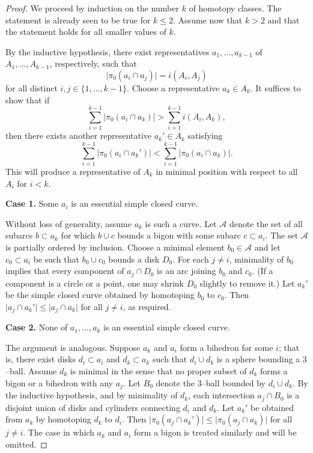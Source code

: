 \documentclass[12pt,a4paper]{amsart}
\numberwithin{equation}{section}
\theoremstyle{plain}
\theoremstyle{definition}
\theoremstyle{remark}
\begin{document}
\begin{proof}
    We proceed by induction on the number \(k\) of homotopy classes.  
    The statement is already seen to be true for \(k \le 2\).  
    Assume now that \(k > 2\) and that the statement holds for all smaller values of \(k\).  
    
    By the inductive hypothesis, there exist representatives \(a_1, \dots, a_{k-1}\) of \(A_1, \dots, A_{k-1}\), respectively, such that  
    \[
    \lvert \pi_0(a_i \cap a_j) \rvert = i(A_i, A_j)
    \]
    for all distinct $i, j \in \{1, \dots, k-1\}$.
    Choose a representative \(a_k \in A_k\).  
    It suffices to show that if
    \[
    \sum_{i=1}^{k-1} \lvert \pi_0(a_i \cap a_k) \rvert
    >
    \sum_{i=1}^{k-1} i(A_i, A_k),
    \]
    then there exists another representative \(a_k' \in A_k\) satisfying
    \[
    \sum_{i=1}^{k-1} \lvert \pi_0(a_i \cap a_k') \rvert
    <
    \sum_{i=1}^{k-1} \lvert \pi_0(a_i \cap a_k) \rvert.
    \]
    This will produce a representative of \(A_k\) in minimal position with respect to all \(A_i\) for \(i < k\).
    
    \medskip
    \noindent
    \textbf{Case 1.} Some \(a_i\) is an essential simple closed curve.  

    \medskip
    Without loss of generality, assume \(a_k\) is such a curve.  
    Let \(\mathcal{A}\) denote the set of all subarcs \(b \subset a_k\) for which \(b \cup c\) bounds a bigon with some subarc \(c \subset a_i\).  
    The set \(\mathcal{A}\) is partially ordered by inclusion.  
    Choose a minimal element \(b_0 \in \mathcal{A}\) and let \(c_0 \subset a_i\) be such that \(b_0 \cup c_0\) bounds a disk \(D_0\).  
    For each \(j \ne i\), minimality of \(b_0\) implies that every component of \(a_j \cap D_0\) is an arc joining \(b_0\) and \(c_0\).  
    (If a component is a circle or a point, one may shrink \(D_0\) slightly to remove it.)  
    Let \(a_k'\) be the simple closed curve obtained by homotoping \(b_0\) to \(c_0\).  
    Then \(\lvert a_j \cap a_k' \rvert \le \lvert a_j \cap a_k \rvert\) for all \(j \ne i\), as required.
    
    \medskip
    \noindent
    \textbf{Case 2.} None of \(a_1, \dots, a_k\) is an essential simple closed curve.

    \medskip
    The argument is analogous.  
    Suppose \(a_k\) and \(a_i\) form a bihedron for some \(i\); that is, there exist disks \(d_i \subset a_i\) and \(d_k \subset a_k\) such that \(d_i \cup d_k\) is a sphere bounding a \(3\)--ball.  
    Assume \(d_k\) is minimal in the sense that no proper subset of \(d_k\) forms a bigon or a bihedron with any \(a_j\).  
    Let \(B_0\) denote the \(3\)--ball bounded by \(d_i \cup d_k\).  
    By the inductive hypothesis, and by minimality of \(d_k\), each intersection \(a_j \cap B_0\) is a disjoint union of disks and cylinders connecting \(d_i\) and \(d_k\).  
    Let \(a_k'\) be obtained from \(a_k\) by homotoping \(d_k\) to \(d_i\).  
    Then \(\lvert \pi_0(a_j \cap a_k') \rvert \le \lvert \pi_0(a_j \cap a_k) \rvert\) for all \(j \ne i\).  
    The case in which \(a_k\) and \(a_i\) form a bigon is treated similarly and will be omitted.
    

\end{proof}
\end{document}

